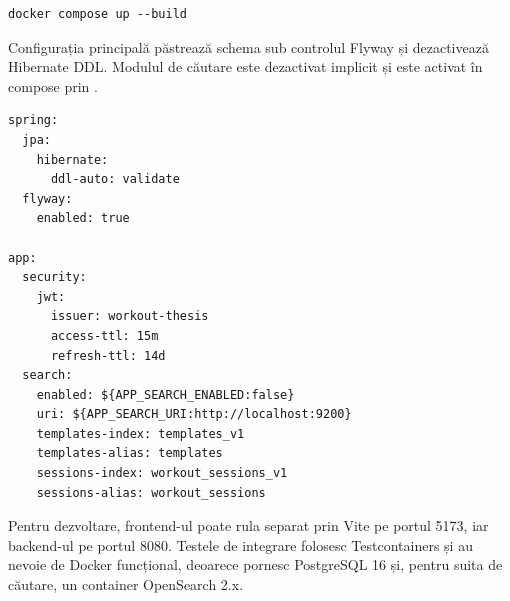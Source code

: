 \begin{lstlisting}
docker compose up --build
\end{lstlisting}

Configurația principală păstrează schema sub controlul Flyway și dezactivează Hibernate DDL. Modulul de
căutare este dezactivat implicit și este activat în compose prin .

\begin{lstlisting}
spring:
  jpa:
    hibernate:
      ddl-auto: validate
  flyway:
    enabled: true

app:
  security:
    jwt:
      issuer: workout-thesis
      access-ttl: 15m
      refresh-ttl: 14d
  search:
    enabled: ${APP_SEARCH_ENABLED:false}
    uri: ${APP_SEARCH_URI:http://localhost:9200}
    templates-index: templates_v1
    templates-alias: templates
    sessions-index: workout_sessions_v1
    sessions-alias: workout_sessions
\end{lstlisting}

Pentru dezvoltare, frontend-ul poate rula separat prin Vite pe portul 5173, iar backend-ul pe portul
8080. Testele de integrare folosesc Testcontainers și au nevoie de Docker funcțional, deoarece pornesc
PostgreSQL 16 și, pentru suita de căutare, un container OpenSearch 2.x.
